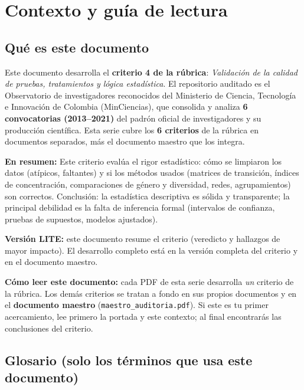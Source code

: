 \section{Contexto y guía de lectura}

\subsection{Qué es este documento}

Este documento desarrolla el \textbf{criterio 4 de la rúbrica}:
\emph{Validación de la calidad de pruebas, tratamientos y lógica estadística}. El repositorio auditado es el
Observatorio de investigadores reconocidos del Ministerio de Ciencia,
Tecnología e Innovación de Colombia (MinCiencias), que consolida y analiza
\textbf{6 convocatorias (2013--2021)} del padrón oficial de investigadores
y su producción científica. Esta serie cubre los \textbf{6 criterios} de la
rúbrica en documentos separados, más el documento maestro que los integra.

\textbf{En resumen:} Este criterio evalúa el rigor estadístico: cómo se limpiaron los datos (atípicos, faltantes) y si los métodos usados (matrices de transición, índices de concentración, comparaciones de género y diversidad, redes, agrupamientos) son correctos. Conclusión: la estadística descriptiva es sólida y transparente; la principal debilidad es la falta de inferencia formal (intervalos de confianza, pruebas de supuestos, modelos ajustados).


\begin{tcolorbox}[nota]\textbf{Versión LITE:} este documento resume el criterio (veredicto y hallazgos de mayor impacto). El desarrollo completo está en la versión completa del criterio y en el documento maestro.\end{tcolorbox}

\begin{tcolorbox}[nota]
\textbf{Cómo leer este documento:} cada PDF de esta serie desarrolla \emph{un}
criterio de la rúbrica. Los demás criterios se tratan a fondo en sus propios
documentos y en el \textbf{documento maestro} (\texttt{maestro\_auditoria.pdf}).
Si este es tu primer acercamiento, lee primero la portada y este contexto; al
final encontrarás las conclusiones del criterio.
\end{tcolorbox}

\subsection{Glosario (solo los términos que usa este documento)}

